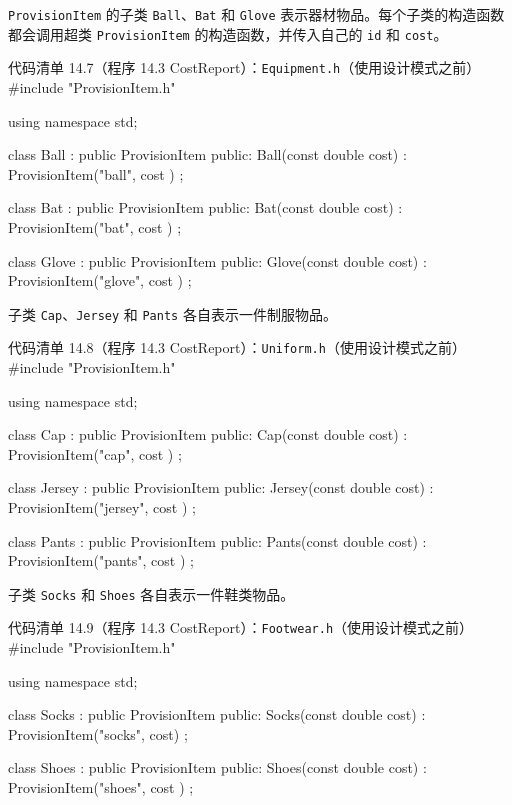 \texttt{Provision\allowbreak{}Item} 的子类 \texttt{Ball}、\texttt{Bat} 和 \texttt{Glove} 表示器材物品。每个子类的构造函数都会调用超类 \texttt{Provision\allowbreak{}Item} 的构造函数，并传入自己的 \texttt{id} 和 \texttt{cost}。

\begin{codeboxt}{代码清单 14.7（程序 14.3 CostReport）：\texttt{Equipment.\allowbreak{}h}（使用设计模式之前）}
#include "ProvisionItem.h"

using namespace std;

class Ball : public ProvisionItem
{
public:
    Ball(const double cost) : ProvisionItem("ball", cost ) {}
};

class Bat : public ProvisionItem
{
public:
    Bat(const double cost) : ProvisionItem("bat", cost ) {}
};

class Glove : public ProvisionItem
{
public:
    Glove(const double cost) : ProvisionItem("glove", cost ) {}
};
\end{codeboxt}

子类 \texttt{Cap}、\texttt{Jersey} 和 \texttt{Pants} 各自表示一件制服物品。

\begin{codeboxt}{代码清单 14.8（程序 14.3 CostReport）：\texttt{Uniform.h}（使用设计模式之前）}
#include "ProvisionItem.h"

using namespace std;

class Cap : public ProvisionItem
{
public:
    Cap(const double cost) : ProvisionItem("cap", cost ) {}
};

class Jersey : public ProvisionItem
{
public:
    Jersey(const double cost) : ProvisionItem("jersey", cost ) {}
};

class Pants : public ProvisionItem
{
public:
    Pants(const double cost) : ProvisionItem("pants", cost ) {}
};
\end{codeboxt}

子类 \texttt{Socks} 和 \texttt{Shoes} 各自表示一件鞋类物品。

\begin{codeboxt}{代码清单 14.9（程序 14.3 CostReport）：\texttt{Footwear.\allowbreak{}h}（使用设计模式之前）}
#include "ProvisionItem.h"

using namespace std;

class Socks : public ProvisionItem
{
public:
    Socks(const double cost) : ProvisionItem("socks", cost) {}
};

class Shoes : public ProvisionItem
{
public:
    Shoes(const double cost) : ProvisionItem("shoes", cost ) {}
};
\end{codeboxt}


